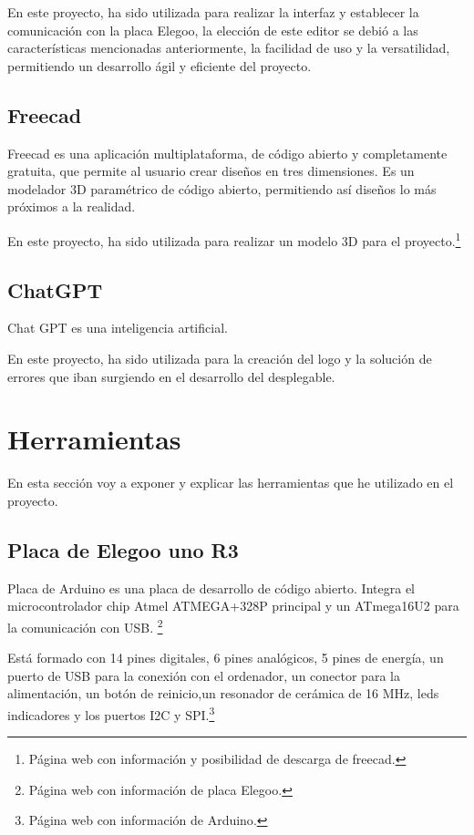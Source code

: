 En este proyecto, ha sido utilizada para realizar la interfaz y establecer la comunicación con la placa Elegoo, la elección de este editor se debió a las características mencionadas anteriormente, la facilidad de uso y la versatilidad, permitiendo un desarrollo ágil y eficiente del proyecto.
\subsection{Freecad}
Freecad es una aplicación multiplataforma, de código abierto y completamente gratuita, que permite al usuario crear diseños en tres dimensiones.
Es un modelador 3D paramétrico de código abierto, permitiendo así diseños lo más próximos a la realidad.

En este proyecto, ha sido utilizada para realizar un modelo 3D para el proyecto.\cite{freecad}\footnote{Página web con información y posibilidad de descarga de freecad\cite{freecad}.} 
\subsection{ChatGPT}
Chat GPT es una inteligencia artificial.

En este proyecto, ha sido utilizada para la creación del logo y la solución de errores que iban surgiendo en el desarrollo del desplegable.
\section{Herramientas}
En esta sección voy a exponer y explicar las herramientas que he utilizado en el proyecto.
\subsection{Placa de Elegoo uno R3}
Placa de Arduino es una placa de desarrollo de código abierto. 
Integra el microcontrolador chip Atmel ATMEGA+328P principal y un ATmega16U2 para la comunicación con USB. \cite{Elegoo}\footnote{Página web con información de placa Elegoo\cite{Elegoo}.}

Está formado con 14 pines digitales, 6 pines analógicos, 5 pines de energía, un puerto de USB para la conexión con el ordenador, un conector para la alimentación, un botón de reinicio,un resonador de cerámica de 16 MHz, leds indicadores y los puertos I2C y SPI.\cite{Arduino}\footnote{Página web con información de Arduino\cite{Arduino}.}

